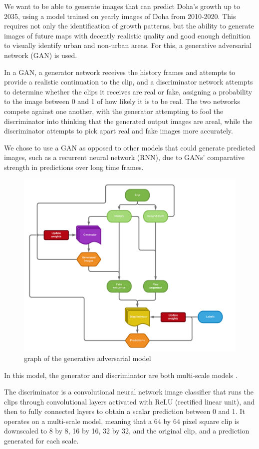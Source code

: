 \documentclass{article}
\begin{document}
We want to be able to generate images that can predict Doha's growth up to 2035, using a model trained on yearly images of Doha from 2010-2020. This requires not only the identification of growth patterns, but the ability to generate images of future maps with decently realistic quality and good enough definition to visually identify urban and non-urban areas. For this, a generative adversarial network (GAN) is used. \cite{goodfellow}

In a GAN, a generator network receives the history frames and attempts to provide a realistic continuation to the clip, and a discriminator network attempts to determine whether the clips it receives are real or fake, assigning a probability to the image between 0 and 1 of how likely it is to be real. The two networks compete against one another, with the generator attempting to fool the discriminator into thinking that the generated output images are areal, while the discriminator attempts to pick apart real and fake images more accurately.

We chose to use a GAN as opposed to other models that could generate predicted images, such as a recurrent neural network (RNN), due to GANs' comparative strength in predictions over long time frames.  

\begin{figure}[H]
    \caption{graph of the generative adversarial model}
    \centering
    \includegraphics[width=0.7\linewidth]{gan-graph.png}
\end{figure}

\clearpage

In this model, the generator and discriminator are both multi-scale models \cite{multiscale}.

The discriminator is a convolutional neural network image classifier that runs the clips through convolutional layers activated with ReLU (rectified linear unit), and then to fully connected layers to obtain a scalar prediction between 0 and 1. It operates on a multi-scale model, meaning that a 64 by 64 pixel square clip is downscaled to 8 by 8, 16 by 16, 32 by 32, and the original clip, and a prediction generated for each scale.
\end{document}
